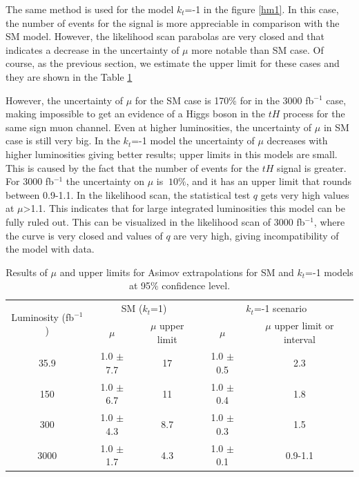 	The same method is used for the model $k_t$=-1 in the figure \ref{hm1}. In this case, the number of events for the signal is more appreciable in comparison with the SM model. However, the likelihood scan parabolas are very closed and that indicates a decrease in the uncertainty of $\mu$ more notable than SM case. 
	Of course, as the previous section, we estimate the upper limit for these cases and they are shown in the Table \ref{upper}
	
	However, the uncertainty of $\mu$ for the SM case is 170$\%$ for  in the 3000 fb$^{-1}$ case, making impossible to get an evidence of a Higgs boson in the $tH$ process for the same sign muon channel. Even at higher luminosities, the uncertainty of $\mu$ in SM case is still very big.
	In the $k_t$=-1 model the uncertainty of $\mu$ decreases with higher luminosities giving better results; upper limits in this models are small. This is caused by the fact that the number of events for the $tH$ signal is greater. For 3000 fb$^{-1}$ the uncertainty on $\mu$ is $~10\%$, and it has an upper limit that rounds between 0.9-1.1. In the likelihood scan, the statistical test $q$ gets very high values at $\mu$>1.1. This indicates that for large integrated luminosities this model can be fully ruled out. This can be visualized in the likelihood scan of  3000 fb$^{-1}$, where the curve is very closed and values of $q$ are very high, giving incompatibility of the model with data.

	\begin{table}[ht]
		\caption{Results of $\mu$ and upper limits for Asimov extrapolations for SM  and $k_t$=-1 models at 95$\%$ confidence level.}
		\begin{tabular}{|c|c|c|c|c|}
			\hline
			\multirow{2}{*}{Luminosity (fb$^{-1}$)}  &\multicolumn{2}{c|}{SM ($k_t$=1)} &\multicolumn{2}{c|}{$k_t$=-1 scenario}\\
		          \hhline{~----}	&$\mu$  &$\mu$ upper limit & $\mu$ &$\mu$ upper limit or interval\\
			\hline
			35.9 & 1.0 $\pm$ 7.7 & 17 & 1.0 $\pm$ 0.5 & 2.3 \\
			\hline
			150& 1.0 $\pm$ 6.7& 11 & 1.0 $\pm$ 0.4 &1.8\\
			\hline
			300&1.0 $\pm$ 4.3 &8.7 & 1.0 $\pm$ 0.3 &1.5 \\
			\hline
			3000&1.0 $\pm$ 1.7 & 4.3 &	 1.0 $\pm$ 0.1 & 0.9-1.1\\
			\hline
		\end{tabular}
		\label{upper}
	\end{table}

